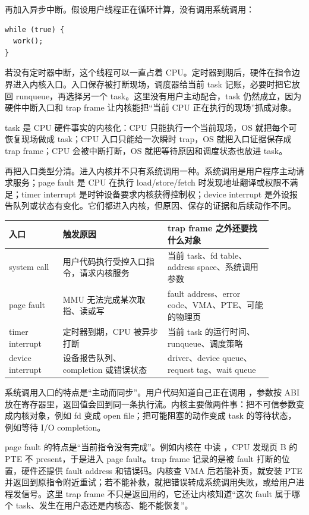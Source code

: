 再加入异步中断。假设用户线程正在循环计算，没有调用系统调用：

\begin{lstlisting}
while (true) {
  work();
}
\end{lstlisting}

若没有定时器中断，这个线程可以一直占着 CPU。定时器到期后，硬件在指令边界进入内核入口。入口保存被打断现场，调度器给当前 task 记账，必要时把它放回 runqueue，再选择另一个 task。这里没有用户主动配合，task 仍然成立，因为硬件中断入口和 trap frame 让内核能把“当前 CPU 正在执行的现场”抓成对象。

\begin{keyidea}
task 是 CPU 硬件事实的内核化：CPU 只能执行一个当前现场，OS 就把每个可恢复现场做成 task；CPU 入口只能给一次瞬时 trap，OS 就把入口证据保存成 trap frame；CPU 会被中断打断，OS 就把等待原因和调度状态也放进 task。
\end{keyidea}

再把入口类型分清。进入内核并不只有系统调用一种。系统调用是用户程序主动请求服务；page fault 是 CPU 在执行 load/store/fetch 时发现地址翻译或权限不满足；timer interrupt 是时钟设备要求内核获得控制权；device interrupt 是外设报告队列或状态有变化。它们都进入内核，但原因、保存的证据和后续动作不同。

\begin{longtable}{p{0.18\linewidth}p{0.35\linewidth}p{0.35\linewidth}}
\toprule
入口 & 触发原因 & trap frame 之外还要找什么对象 \\
\midrule
system call & 用户代码执行受控入口指令，请求内核服务 & 当前 task、fd table、address space、系统调用参数 \\
page fault & MMU 无法完成某次取指、读或写 & fault address、error code、VMA、PTE、可能的物理页 \\
timer interrupt & 定时器到期，CPU 被异步打断 & 当前 task 的运行时间、runqueue、调度策略 \\
device interrupt & 设备报告队列、completion 或错误状态 & driver、device queue、request tag、wait queue \\
\bottomrule
\end{longtable}

系统调用入口的特点是“主动而同步”。用户代码知道自己正在调用 ，参数按 ABI 放在寄存器里，返回值会回到同一条执行流。内核主要做两件事：把不可信参数变成内核对象，例如 fd 变成 open file；把可能阻塞的动作变成 task 的等待状态，例如等待 I/O completion。

page fault 的特点是“当前指令没有完成”。例如内核在  中读 ，CPU 发现页 B 的 PTE 不 present，于是进入 page fault。trap frame 记录的是被 fault 打断的位置，硬件还提供 fault address 和错误码。内核查 VMA 后若能补页，就安装 PTE 并返回到原指令附近重试；若不能补救，就把错误转成系统调用失败，或给用户进程发信号。这里 trap frame 不只是返回用的，它还让内核知道“这次 fault 属于哪个 task、发生在用户态还是内核态、能不能恢复”。

